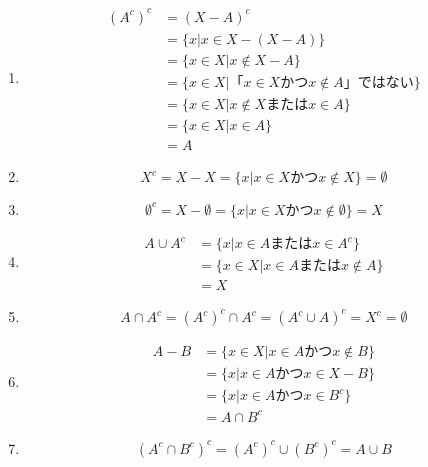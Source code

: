 \documentclass{jsarticle}
\begin{document}
\subsection{}
\begin{enumerate}
\item
\begin{align*}
(A^c)^c&=(X-A)^c\\
&=\{x | x\in X - (X-A)\}\\
&=\{x\in X|x \notin X-A\}\\
&=\{x\in X|「x \in X かつ x \notin A」ではない\}\\
&=\{x\in X| x\notin X または x \in A\}\\
&=\{x\in X | x \in A\}\\
&= A
\end{align*}


\item
\[X^c = X-X =\{x| x\in X かつ x\notin X\}= \emptyset \]

\item
\[\emptyset^c = X-\emptyset = \{x | x\in X かつ x\notin \emptyset\} = X\]

\item
\begin{align*}
A\cup A^c &= \{x| x\in A または x\in A^c\}\\
&=\{x \in X | x \in A または x\notin A\}\\
&=X
\end{align*}

\item
\[A\cap A^c = (A^c)^c \cap A^c = (A^c \cup A)^c = X^c = \emptyset\]

\item
\begin{align*}
A-B&=\{x\in X | x\in A かつ x\notin B\}\\
&=\{x | x\in A かつ x\in X-B\}\\
&=\{x| x\in A かつ x\in B^c\}\\
&= A\cap B^c
\end{align*}

\item

\[(A^c\cap B^c)^c = (A^c)^c \cup (B^c)^c = A\cup B\]

\end{enumerate}
\end{document}
